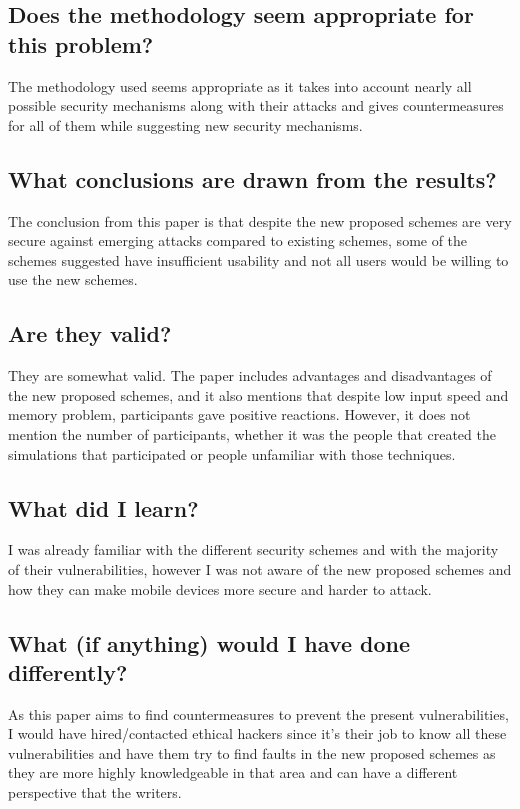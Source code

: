 \documentclass[11pt,a4paper]{article}
\begin{document}
\subsection*{Does the methodology seem appropriate for this problem?}
The methodology used seems appropriate as it takes into account nearly all possible security mechanisms along with their attacks and gives countermeasures for all of them while suggesting new security mechanisms. 

\subsection*{What conclusions are drawn from the results?}
The conclusion from this paper is that despite the new proposed schemes are very secure against emerging attacks compared to existing schemes, some of the schemes suggested have insufficient usability and not all users would be willing to use the new schemes. 

\subsection*{Are they valid?}
They are somewhat valid. The paper includes advantages and disadvantages of the new proposed schemes, and it also mentions that despite low input speed and memory problem, participants gave positive reactions. However, it does not mention the number of participants, whether it was the people that created the simulations that participated or people unfamiliar with those techniques. 

\subsection*{What did I learn?}
I was already familiar with the different security schemes and with the majority of their vulnerabilities, however I was not aware of the new proposed schemes and how they can make mobile devices more secure and harder to attack. 
\subsection*{What (if anything) would I have done differently?}
As this paper aims to find countermeasures to prevent the present vulnerabilities, I would have hired/contacted ethical hackers since it’s their job to know all these vulnerabilities and have them try to find faults in the new proposed schemes as they are more highly knowledgeable in that area and can have a different perspective that the writers.
\end{document}

